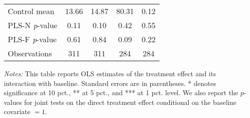 \begin{table}[ht]
{\begin{threeparttable}
\begin{tabular}{l*{4}{c}}
Control mean    &    13.66         &    14.87         &    80.31         &     0.12         \\
PLS-N \emph{p}-value&     0.11         &     0.10         &     0.42         &     0.55         \\
PLS-F \emph{p}-value&     0.61         &     0.84         &     0.09         &     0.22         \\
Observations    &      311         &      311         &      284         &      284         \\
\bottomrule \end{tabular} \begin{tablenotes}[flushleft] \footnotesize \item \emph{Notes:} This table reports OLS estimates of the treatment effect and its interaction with baseline. Standard errors are in parentheses. * denotes significance at 10 pct., ** at 5 pct., and *** at 1 pct. level. We also report the \(p\)-values for joint tests on the direct treatment effect conditional on the baseline covariate $= 1$. \end{tablenotes} \end{threeparttable} } \end{table}

